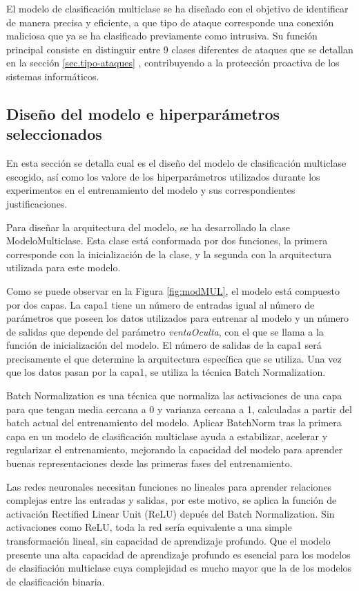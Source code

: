 El modelo de clasificación multiclase se ha diseñado con el objetivo de identificar de manera precisa y eficiente, a que tipo de ataque corresponde una conexión maliciosa que ya se ha clasificado previamente como intrusiva. Su función principal consiste en distinguir entre 9 clases diferentes de ataques que se detallan en la sección \ref{sec.tipo-ataques} , contribuyendo a la protección proactiva de los sistemas informáticos.

\subsection{Diseño del modelo e hiperparámetros seleccionados} \label{sec:disMUL}
En esta sección se detalla cual es el diseño del modelo de clasificación multiclase escogido, así como los valore de los hiperparámetros utilizados durante los experimentos en el entrenamiento del modelo y sus correspondientes justificaciones.

Para diseñar la arquitectura del modelo, se ha desarrollado la clase ModeloMulticlase. Esta clase está conformada por dos funciones, la primera corresponde con la inicialización de la clase, y la segunda con la arquitectura utilizada para este modelo.

Como se puede observar en la Figura \ref{fig:modMUL}, el modelo está compuesto por dos capas. La capa1 tiene un número de entradas igual al número de parámetros que poseen los datos utilizados para entrenar al modelo y un número de salidas que depende del parámetro \textit{ventaOculta}, con el que se llama a la función de inicialización del modelo. El número de salidas de la capa1 será precisamente el que determine la arquitectura específica que se utiliza. Una vez que los datos pasan por la capa1, se utiliza la técnica Batch Normalization. 

Batch Normalization es una técnica que normaliza las activaciones de una capa para que tengan media cercana a 0 y varianza cercana a 1, calculadas a partir del batch actual del entrenamiento del modelo. Aplicar BatchNorm tras la primera capa en un modelo de clasificación multiclase ayuda a estabilizar, acelerar y regularizar el entrenamiento, mejorando la capacidad del modelo para aprender buenas representaciones desde las primeras fases del entrenamiento.

Las redes neuronales necesitan funciones no lineales para aprender relaciones complejas entre las entradas y salidas, por este motivo, se aplica la función de activación Rectified Linear Unit (ReLU) depués del Batch Normalization. Sin activaciones como ReLU, toda la red sería equivalente a una simple transformación lineal, sin capacidad de aprendizaje profundo. Que el modelo presente una alta capacidad de aprendizaje profundo es esencial para los modelos de clasifiación multiclase cuya complejidad es mucho mayor que la de los modelos de clasificación binaria.

